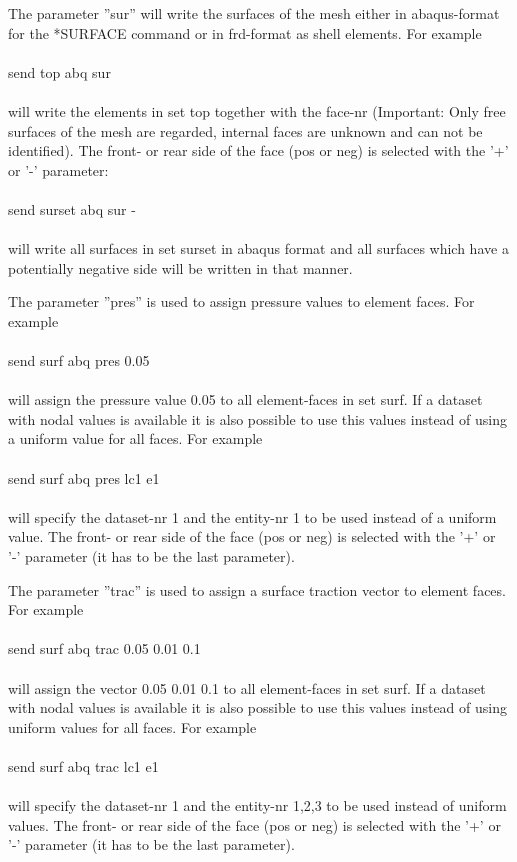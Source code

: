\documentclass{article}
\begin{document}
The parameter ''sur'' will write the surfaces of the mesh either in abaqus-format for the *SURFACE command or in frd-format as shell elements. For example\\\\send top abq sur\\\\will write the elements in set top together with the face-nr (Important: Only free surfaces of the mesh are regarded, internal faces are unknown and can not be identified). The front- or rear side of the face (pos or neg) is selected with the '+' or '-' parameter:\\\\send surset abq sur -\\\\will write all surfaces in set surset in abaqus format and all surfaces which have a potentially negative side will be written in that manner. 

The parameter ''pres'' is used to assign pressure values to element faces. For example\\\\send surf abq pres 0.05\\\\will assign the pressure value 0.05 to all element-faces in set surf. If a dataset with nodal values is available it is also possible to use this values instead of using a uniform value for all faces. For example\\\\send surf abq pres lc1 e1\\\\will specify the dataset-nr 1 and the entity-nr 1 to be used instead of a uniform value. The front- or rear side of the face (pos or neg) is selected with the '+' or '-' parameter (it has to be the last parameter).

The parameter ''trac'' is used to assign a surface traction vector to element faces. For example\\\\send surf abq trac 0.05 0.01 0.1\\\\will assign the vector 0.05 0.01 0.1 to all element-faces in set surf. If a dataset with nodal values is available it is also possible to use this values instead of using uniform values for all faces. For example\\\\send surf abq trac lc1 e1\\\\will specify the dataset-nr 1 and the entity-nr 1,2,3 to be used instead of uniform values. The front- or rear side of the face (pos or neg) is selected with the '+' or '-' parameter (it has to be the last parameter).
\end{document}
